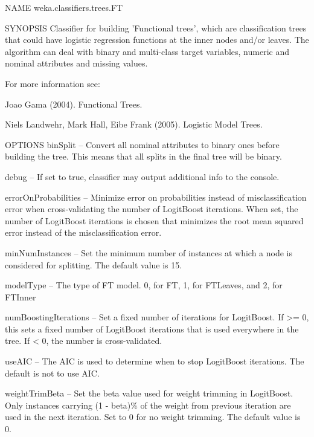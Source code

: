 NAME
weka.classifiers.trees.FT

SYNOPSIS
Classifier for building 'Functional trees', which are classification trees  that could have logistic regression functions at the inner nodes and/or leaves. The algorithm can deal with binary and multi-class target variables, numeric and nominal attributes and missing values.

For more information see: 

Joao Gama (2004). Functional Trees.

Niels Landwehr, Mark Hall, Eibe Frank (2005). Logistic Model Trees.

OPTIONS
binSplit -- Convert all nominal attributes to binary ones before building the tree. This means that all splits in the final tree will be binary.

debug -- If set to true, classifier may output additional info to the console.

errorOnProbabilities -- Minimize error on probabilities instead of misclassification error when cross-validating the number of LogitBoost iterations. When set, the number of LogitBoost iterations is chosen that minimizes the root mean squared error instead of the misclassification error.

minNumInstances -- Set the minimum number of instances at which a node is considered for splitting. The default value is 15.

modelType -- The type of FT model. 0, for FT, 1, for FTLeaves, and 2, for FTInner

numBoostingIterations -- Set a fixed number of iterations for LogitBoost. If >= 0, this sets a fixed number of LogitBoost iterations that is used everywhere in the tree. If < 0, the number is cross-validated.

useAIC -- The AIC is used to determine when to stop LogitBoost iterations. The default is not to use AIC.

weightTrimBeta -- Set the beta value used for weight trimming in LogitBoost. Only instances carrying (1 - beta)\% of the weight from previous iteration are used in the next iteration. Set to 0 for no weight trimming. The default value is 0.
